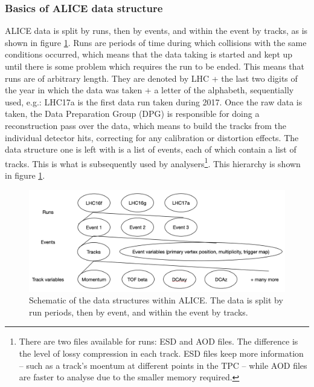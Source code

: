 \subsubsection{Basics of ALICE data structure}
ALICE data is split by runs, then by events, and within the event by tracks, as is shown in figure \ref{fig:ALICE_data_schematic}. Runs are periods of time during which collisions with the same conditions occurred, which means that the data taking is started and kept up until there is some problem which requires the run to be ended. This means that runs are of arbitrary length. They are denoted by LHC + the last two digits of the year in which the data was taken + a letter of the alphabeth, sequentially used, e.g.: LHC17a is the first data run taken during 2017. Once the raw data is taken, the Data Preparation Group (DPG) is responsible for doing a reconstruction pass over the data, which means to build the tracks from the individual detector hits, correcting for any calibration or distortion effects. The data structure  one is left with is a list of events, each of which contain a list of tracks. This is what is subsequently used by analysers\footnote{There are two files available for runs: ESD and AOD files. The difference is the level of lossy compression in each track. ESD files keep more information -- such as a track's moentum at different points in the TPC -- while AOD files are faster to analyse due to the smaller memory required.}. This hierarchy is shown in figure \ref{fig:ALICE_data_schematic}.

\begin{figure}
	\includegraphics[width=\textwidth]{figures/data_structure.png}
	\centering
	\caption{Schematic of the data structures within ALICE. The data is split by run periods, then by event, and within the event by tracks. }
		\label{fig:ALICE_data_schematic}
\end{figure}
